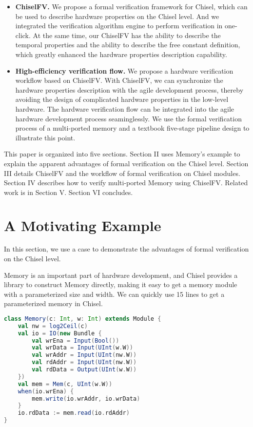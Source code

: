 \documentclass[conference]{IEEEtran}
\theoremstyle{definition}
\begin{document}
\begin{itemize}
    \item \textbf{ChiselFV.} We propose a formal verification framework for Chisel, which can be used to describe hardware properties on the Chisel level. And we integrated the verification algorithm engine to perform verification in one-click. At the same time, our ChiselFV has the ability to describe the temporal properties and the ability to describe the free constant definition, which greatly enhanced the hardware properties description capability.
    \item \textbf{High-efficiency verification flow.} We propose a hardware verification workflow based on ChiselFV. With ChiselFV, we can synchronize the hardware properties description with the agile development process, thereby avoiding the design of complicated hardware properties in the low-level hardware. The hardware verification flow can be integrated into the agile hardware development process seaminglessly. 
    We use the formal verification process of a multi-ported memory and a textbook five-stage pipeline design to illustrate this point.
\end{itemize}

This paper is organized into five sections. Section II uses Memory's example to explain the apparent advantages of formal verification on the Chisel level. Section III details ChiselFV and the workflow of formal verification on Chisel modules. Section IV describes how to verify multi-ported Memory using ChiselFV. Related work is in Section V. Section VI concludes.

\section{A Motivating Example}
In this section, we use a case to demonstrate the advantages of formal verification on the Chisel level.

Memory is an important part of hardware development, and Chisel provides a library to construct Memory directly, making it easy to get a memory module with a parameterized size and width.
We can quickly use 15 lines to get a parameterized memory in Chisel.

\begin{lstlisting}[language=scala, caption={A memory of size c and width w in Chisel}, label=mem]
class Memory(c: Int, w: Int) extends Module {
    val nw = log2Ceil(c)
    val io = IO(new Bundle {
        val wrEna = Input(Bool())
        val wrData = Input(UInt(w.W))
        val wrAddr = Input(UInt(nw.W))
        val rdAddr = Input(UInt(nw.W))
        val rdData = Output(UInt(w.W))
    })
    val mem = Mem(c, UInt(w.W))
    when(io.wrEna) {
        mem.write(io.wrAddr, io.wrData)
    }
    io.rdData := mem.read(io.rdAddr)
}
\end{lstlisting}
\end{document}
